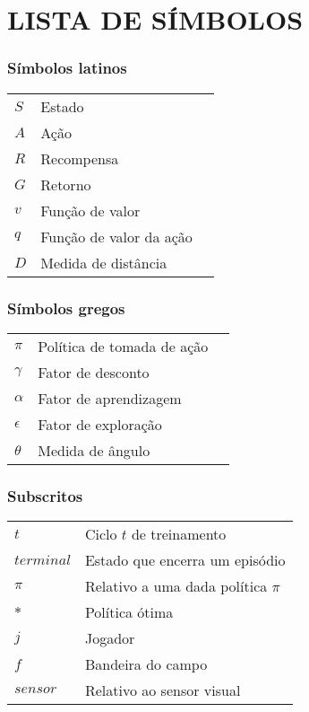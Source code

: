 




\chapter*{LISTA DE SÍMBOLOS}


\subsection*{Símbolos latinos}

\begin{tabular}{p{}p{}>{\PreserveBacklash\raggedleft}p{}}
	$S$ & Estado \tabularnewline
	$A$ & Ação \tabularnewline
	$R$ & Recompensa \tabularnewline
	$G$ & Retorno \tabularnewline
	$v$ & Função de valor \tabularnewline
	$q$ & Função de valor da ação\tabularnewline
	$D$ & Medida de distância \tabularnewline
\end{tabular}

\subsection*{Símbolos gregos}

\begin{tabular}{p{}p{}>{\PreserveBacklash\raggedleft}p{}}
$\pi$ & Política de tomada de ação \tabularnewline
$\gamma$ & Fator de desconto \tabularnewline
$\alpha$ & Fator de aprendizagem \tabularnewline
$\epsilon$ & Fator de exploração \tabularnewline
$\theta$ & Medida de ângulo \tabularnewline
\end{tabular}

\subsection*{Subscritos}

\begin{tabular}{p{}p{}}
$t$  & Ciclo $t$ de treinamento \tabularnewline
$terminal$  & Estado que encerra um episódio \tabularnewline
$\pi$	& Relativo a uma dada política $\pi$ \tabularnewline
$*$  & Política ótima \tabularnewline
$j$  & Jogador \tabularnewline
$f$  & Bandeira do campo \tabularnewline
$sensor$  & Relativo ao sensor visual \tabularnewline
\end{tabular}

